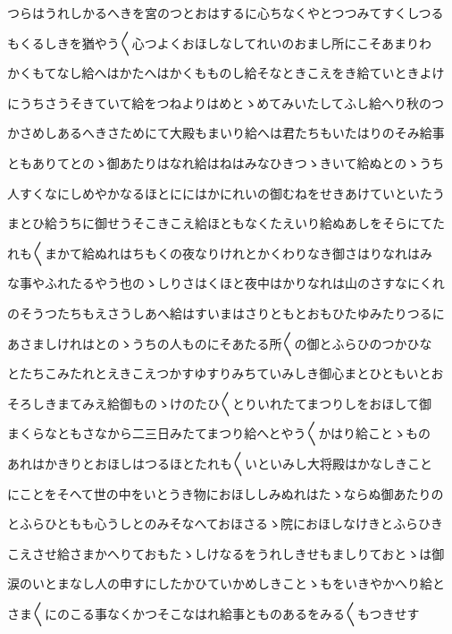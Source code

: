 \documentclass[a4paper,11pt,landscape]{ltjtarticle}
\begin{document}
\par\medskip
つらはうれしかるへきを宮のつとおはするに心ちなくやとつつみてすくしつる
\par\medskip
もくるしきを猶やう〱心つよくおほしなしてれいのおまし所にこそあまりわ
\par\medskip
かくもてなし給へはかたへはかくもものし給そなときこえをき給ていときよけ
\par\medskip
にうちさうそきていて給をつねよりはめとゝめてみいたしてふし給へり秋のつ
\par\medskip
かさめしあるへきさためにて大殿もまいり給へは君たちもいたはりのそみ給事
\par\medskip
ともありてとのゝ御あたりはなれ給はねはみなひきつゝきいて給ぬとのゝうち
\par\medskip
人すくなにしめやかなるほとににはかにれいの御むねをせきあけていといたう
\par\medskip
まとひ給うちに御せうそこきこえ給ほともなくたえいり給ぬあしをそらにてた
\par\medskip
れも〱まかて給ぬれはちもくの夜なりけれとかくわりなき御さはりなれはみ
\par\medskip
な事やふれたるやう也のゝしりさはくほと夜中はかりなれは山のさすなにくれ
\par\medskip
のそうつたちもえさうしあへ給はすいまはさりともとおもひたゆみたりつるに
\par\medskip
あさましけれはとのゝうちの人ものにそあたる所〱の御とふらひのつかひな
\par\medskip
とたちこみたれとえきこえつかすゆすりみちていみしき御心まとひともいとお
\par\medskip
そろしきまてみえ給御ものゝけのたひ〱とりいれたてまつりしをおほして御
\par\medskip
まくらなともさなから二三日みたてまつり給へとやう〱かはり給ことゝもの
\par\medskip
あれはかきりとおほしはつるほとたれも〱いといみし大将殿はかなしきこと
\par\medskip
にことをそへて世の中をいとうき物におほししみぬれはたゝならぬ御あたりの
\par\medskip
とふらひともも心うしとのみそなへておほさるゝ院におほしなけきとふらひき
\par\medskip
こえさせ給さまかへりておもたゝしけなるをうれしきせもましりておとゝは御
\par\medskip
涙のいとまなし人の申すにしたかひていかめしきことゝもをいきやかへり給と
\par\medskip
さま〱にのこる事なくかつそこなはれ給事とものあるをみる〱もつきせす
\par\medskip
\end{document}
